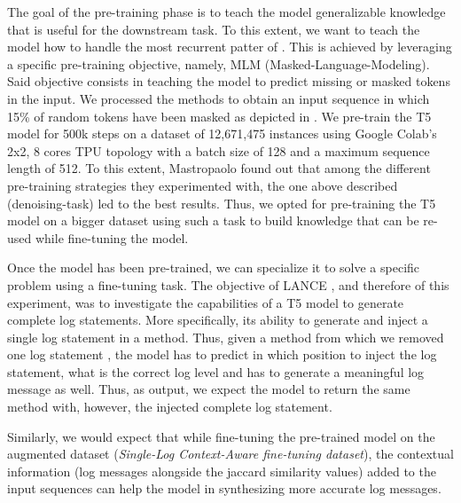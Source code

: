 The goal of the pre-training phase is to teach the model generalizable knowledge that is useful for the downstream task. To this extent, we want to teach the model how to handle the most recurrent patter of \java. This is achieved by leveraging a specific pre-training objective, namely, MLM (Masked-Language-Modeling). Said objective consists in teaching the model to predict missing or masked tokens in the input. We processed the methods to obtain an input sequence in which 15\% of random tokens have been masked as depicted in .
We pre-train the T5 model for 500k steps on a dataset of 12,671,475 instances using Google Colab's 2x2, 8 cores TPU topology with a batch size of 128 and a maximum sequence length of 512.
To this extent, Mastropaolo \etal \cite{mastropaolo2022using} found out that among the different pre-training strategies they experimented with, the one above described (\ie denoising-task) led to the best results. Thus, we opted for pre-training the T5 model on a bigger dataset using such a task to build knowledge that can be re-used while fine-tuning the model.

Once the model has been pre-trained, we can specialize it to solve a specific problem using a fine-tuning task. The objective of LANCE \cite{mastropaolo2022using}, and therefore of this experiment, was to investigate the capabilities of a T5 model to generate complete log statements. More specifically, its ability to generate and inject a single log statement in a \java method. Thus, given a \java method from which we removed one log statement , the model has to predict in which position to inject the log statement, what is the correct log level and has to generate a meaningful log message as well. Thus, as output, we expect the model to return the same \java method with, however, the injected complete log statement. 

Similarly, we would expect that while fine-tuning the pre-trained model on the augmented dataset (\ie  \textit{Single-Log Context-Aware fine-tuning dataset}), the contextual information (\ie log messages alongside the jaccard similarity values) added to the input sequences can help the model in synthesizing more accurate log messages.

